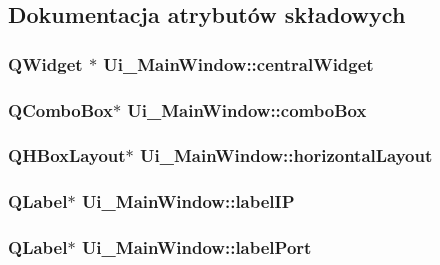 \subsection{Dokumentacja atrybutów składowych}
\hypertarget{classUi__MainWindow_a6600dd3bdd3d55e535659e4a4096ea48}{
\subsubsection[{central\-Widget}]{\setlength{\rightskip}{0pt plus 5cm}Q\-Widget $\ast$ Ui\-\_\-\-Main\-Window\-::central\-Widget}}\label{classUi__MainWindow_a6600dd3bdd3d55e535659e4a4096ea48}
\hypertarget{classUi__MainWindow_af4df84479fcdbcc4c6d2d3e39046317a}{
\subsubsection[{combo\-Box}]{\setlength{\rightskip}{0pt plus 5cm}Q\-Combo\-Box$\ast$ Ui\-\_\-\-Main\-Window\-::combo\-Box}}\label{classUi__MainWindow_af4df84479fcdbcc4c6d2d3e39046317a}
\hypertarget{classUi__MainWindow_acd6fdc9ebacc4b25b834162380d75ce8}{
\subsubsection[{horizontal\-Layout}]{\setlength{\rightskip}{0pt plus 5cm}Q\-H\-Box\-Layout$\ast$ Ui\-\_\-\-Main\-Window\-::horizontal\-Layout}}\label{classUi__MainWindow_acd6fdc9ebacc4b25b834162380d75ce8}
\hypertarget{classUi__MainWindow_a6e626afc4541c9a658e3164a89d10eb3}{
\subsubsection[{label\-I\-P}]{\setlength{\rightskip}{0pt plus 5cm}Q\-Label$\ast$ Ui\-\_\-\-Main\-Window\-::label\-I\-P}}\label{classUi__MainWindow_a6e626afc4541c9a658e3164a89d10eb3}
\hypertarget{classUi__MainWindow_a5b07c23cfb9e49ae640e58c604d3e118}{
\subsubsection[{label\-Port}]{\setlength{\rightskip}{0pt plus 5cm}Q\-Label$\ast$ Ui\-\_\-\-Main\-Window\-::label\-Port}}\label{classUi__MainWindow_a5b07c23cfb9e49ae640e58c604d3e118}
